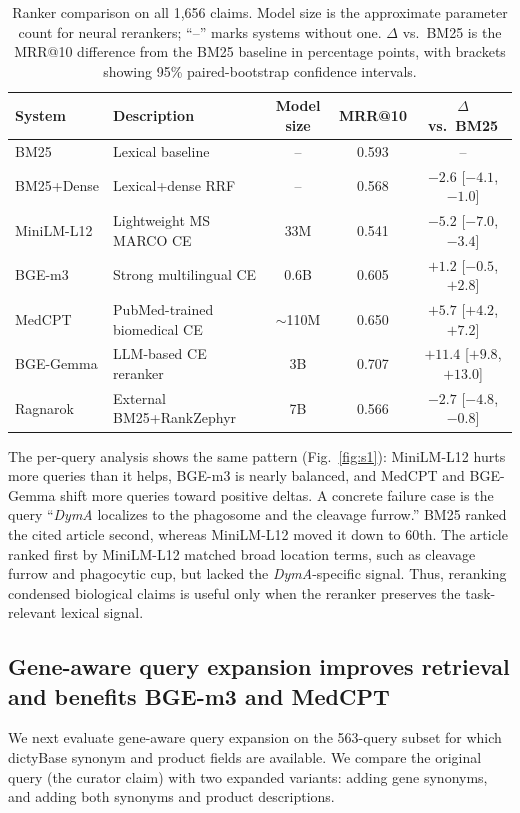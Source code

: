 \documentclass[runningheads]{llncs}
\begin{document}
\begin{table}[!htbp]
\centering
\caption{Ranker comparison on all 1,656 claims. Model size is the approximate parameter count for neural rerankers; ``--'' marks systems without one. $\Delta$ vs.\ BM25 is the MRR@10 difference from the BM25 baseline in percentage points, with brackets showing 95\% paired-bootstrap confidence intervals.}
\label{tab:ranker_comparison}
\scriptsize
\setlength{\tabcolsep}{3pt}
\begin{tabular}{@{}llccc@{}}
\toprule
System & Description & Model size & MRR@10 & $\Delta$ vs.\ BM25 \\
\midrule
BM25       & Lexical baseline              & --          & 0.593 & --                       \\
BM25+Dense & Lexical+dense RRF             & --          & 0.568 & $-2.6$ [$-4.1$,$-1.0$]   \\
MiniLM-L12 & Lightweight MS MARCO CE       & 33M         & 0.541 & $-5.2$ [$-7.0$,$-3.4$]   \\
BGE-m3     & Strong multilingual CE        & 0.6B        & 0.605 & $+1.2$ [$-0.5$,$+2.8$]   \\
MedCPT     & PubMed-trained biomedical CE  & $\sim$110M  & 0.650 & $+5.7$ [$+4.2$,$+7.2$]   \\
BGE-Gemma  & LLM-based CE reranker         & 3B          & 0.707 & $+11.4$ [$+9.8$,$+13.0$] \\
Ragnarok   & External BM25+RankZephyr      & 7B          & 0.566 & $-2.7$ [$-4.8$,$-0.8$]   \\
\bottomrule
\end{tabular}
\end{table}
The per-query analysis shows the same pattern (Fig.~\ref{fig:s1}): MiniLM-L12 hurts more
queries than it helps, BGE-m3 is nearly balanced, and MedCPT and BGE-Gemma shift
more queries toward positive deltas. A concrete failure case is the query
``\emph{DymA} localizes to the phagosome and the cleavage furrow.'' BM25 ranked the
cited article second, whereas MiniLM-L12 moved it down to 60th. The article
ranked first by MiniLM-L12 matched broad location terms, such as cleavage furrow
and phagocytic cup, but lacked the \emph{DymA}-specific signal. Thus, reranking condensed
biological claims is useful only when the reranker preserves the task-relevant
lexical signal.

\subsection{Gene-aware query expansion improves retrieval and benefits BGE-m3 and MedCPT}
\label{sec:results_qe}
We next evaluate gene-aware query expansion on the 563-query subset for which dictyBase synonym and product fields are available. We compare the original query (the curator claim) with two expanded variants: adding gene synonyms, and adding both synonyms and product descriptions.
\end{document}
